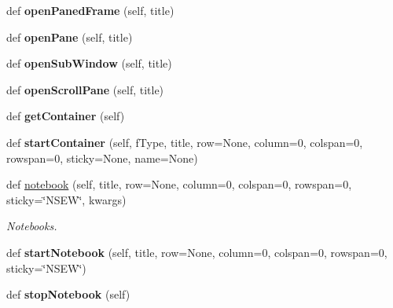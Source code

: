 \begin{DoxyCompactItemize}
\item 
\mbox{\label{classappjar_1_1gui_a026be59697084469171455653aeadb05}} 
def {\bfseries open\+Paned\+Frame} (self, title)
\item 
\mbox{\label{classappjar_1_1gui_afc40a04ac4310bfa8fbb1977f307180b}} 
def {\bfseries open\+Pane} (self, title)
\item 
\mbox{\label{classappjar_1_1gui_a3565852bc5ee9bbe4993a08fbaa9a6d3}} 
def {\bfseries open\+Sub\+Window} (self, title)
\item 
\mbox{\label{classappjar_1_1gui_a7d77f98854038f605330a038d90f981a}} 
def {\bfseries open\+Scroll\+Pane} (self, title)
\item 
\mbox{\label{classappjar_1_1gui_a2e8ea27bae5f6758257be218c8279b56}} 
def {\bfseries get\+Container} (self)
\item 
\mbox{\label{classappjar_1_1gui_a9df71e2385fa4adda4a6d40eac326021}} 
def {\bfseries start\+Container} (self, f\+Type, title, row=None, column=0, colspan=0, rowspan=0, sticky=None, name=None)
\item 
\mbox{\label{classappjar_1_1gui_aa4d42bb1b81edf5c2e7ea7b133b69330}} 
def \hyperlink{classappjar_1_1gui_aa4d42bb1b81edf5c2e7ea7b133b69330}{notebook} (self, title, row=None, column=0, colspan=0, rowspan=0, sticky=\char`\"{}N\+S\+EW\char`\"{}, kwargs)
\begin{DoxyCompactList}\small\item\em Notebooks. \end{DoxyCompactList}\item 
\mbox{\label{classappjar_1_1gui_a0cfa882d41a4a47adbc0619617e3bd9e}} 
def {\bfseries start\+Notebook} (self, title, row=None, column=0, colspan=0, rowspan=0, sticky=\char`\"{}N\+S\+EW\char`\"{})
\item 
\mbox{\label{classappjar_1_1gui_abf035c3c67e0f2c09cb219f1ad4f9e8c}} 
def {\bfseries stop\+Notebook} (self)
\item 
\mbox{\label{classappjar_1_1gui_ae8a964fa835cc955e06f30db3a40d6ab}} 

\end{DoxyCompactItemize}
